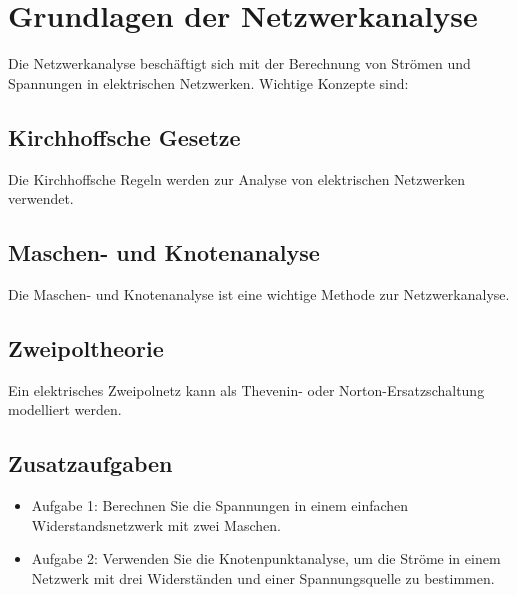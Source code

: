 \documentclass[11pt,a4paper]{article}
\begin{document}
\newpage
\section{Grundlagen der Netzwerkanalyse}
Die Netzwerkanalyse beschäftigt sich mit der Berechnung von Strömen und Spannungen in elektrischen Netzwerken. Wichtige Konzepte sind:

\subsection{Kirchhoffsche Gesetze}
Die Kirchhoffsche Regeln werden zur Analyse von elektrischen Netzwerken verwendet.





\subsection{Maschen- und Knotenanalyse}
Die Maschen- und Knotenanalyse ist eine wichtige Methode zur Netzwerkanalyse.





\subsection{Zweipoltheorie}
Ein elektrisches Zweipolnetz kann als Thevenin- oder Norton-Ersatzschaltung modelliert werden.



\subsection{Zusatzaufgaben}
\begin{itemize}
	\item Aufgabe 1: Berechnen Sie die Spannungen in einem einfachen Widerstandsnetzwerk mit zwei Maschen.
	\item Aufgabe 2: Verwenden Sie die Knotenpunktanalyse, um die Ströme in einem Netzwerk mit drei Widerständen und einer Spannungsquelle zu bestimmen.
\end{itemize}
\end{document}
